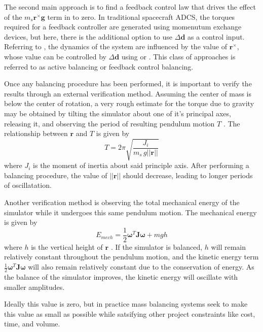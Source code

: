 The second main approach is to find a feedback control law that drives the effect of the $m_s\bm{r}^{\times}\bm{g}$ term in  to zero. In traditional spacecraft ADCS, the torques required for a feedback controller are generated using momenutum exchange devices, but here, there is the additional option to use $\Delta\bm{d}$ as a control input. Referring to , the dynamics of the system are influenced by the value of $\bm{r}^{\times}$, whose value can be controlled by $\Delta\bm{d}$ using  or . This class of approaches is referred to as active balancing or feedback control balancing.

Once any balancing procedure has been performed, it is important to verify the results through an external verification method. Assuming the center of mass is below the center of rotation, a very rough estimate for the torque due to gravity may be obtained by tilting the simulator about one of it's principal axes, releasing it, and observing the period of resulting pendulum motion $T$ \cite{kim_automatic_2009}. The relationship between $\bm{r}$ and $T$ is given by
\begin{equation}
    T = 2\pi\sqrt{\frac{J_i}{m_s\,g||\bm{r}||}}
\end{equation}
where $J_i$ is the moment of inertia about said principle axis. After performing a balancing procedure, the value of $||\bm{r}||$ should decrease, leading to longer periods of oscillatation. 

Another verification method is observing the total mechanical energy of the simulator while it undergoes this same pendulum motion. The mechanical energy is given by
\begin{equation}
    E_{mech} = \frac{1}{2}\bm{\omega}^T\bm{J}\bm{\omega} + mgh
\end{equation}
where $h$ is the vertical height of $\bm{r}$ \cite{silva_filtering_2018}. If the simulator is balanced, $h$ will remain relatively constant throughout the pendulum motion, and the kinetic energy term $\frac{1}{2}\bm{\omega}^T\bm{J}\bm{\omega}$ will also remain relatively constant due to the conservation of energy. As the balance of the simulator improves, the kinetic energy will oscillate with smaller amplitudes.

Ideally this value is zero, but in practice mass balancing systems seek to make this value as small as possible while satsifying other project constraints like cost, time, and volume. 

